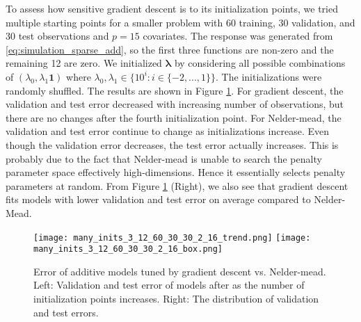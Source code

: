 \documentclass[12pt,letterpaper]{article}
\begin{document}
To assess how sensitive gradient descent is to its initialization points, we tried multiple starting points for a smaller problem with 60 training, 30 validation, and 30 test observations and $p = 15$ covariates. The response was generated from \eqref{eq:simulation_sparse_add}, so the first three functions are non-zero and the remaining 12 are zero. We initialized $\boldsymbol{\lambda}$ by considering all possible combinations of $(\lambda_0, \lambda_1 \boldsymbol{1})$ where $\lambda_0, \lambda_1 \in \{10^i: i\in\{-2, ..., 1\}\}$. The initializations were randomly shuffled. The results are shown in Figure \ref{fig:mult_starts}. For gradient descent, the validation and test error decreased with increasing number of observations, but there are no changes after the fourth initialization point. For Nelder-mead, the validation and test error continue to change as initializations increase. Even though the validation error decreases, the test error actually increases. This is probably due to the fact that Nelder-mead is unable to search the penalty parameter space effectively high-dimensions. Hence it essentially selects penalty parameters at random. From Figure \ref{fig:mult_starts} (Right), we also see that gradient descent fits models with lower validation and test error on average compared to Nelder-Mead.

\begin{figure}
	\label{fig:mult_starts}
	\caption{Error of additive models tuned by gradient descent vs. Nelder-mead. Left: Validation and test error of models after as the number of initialization points increases. Right: The distribution of validation and test errors.}
	\centering
	\texttt{[image: many\_inits\_3\_12\_60\_30\_30\_2\_16\_trend.png]}
	\texttt{[image: many\_inits\_3\_12\_60\_30\_30\_2\_16\_box.png]}
\end{figure}
\end{document}
